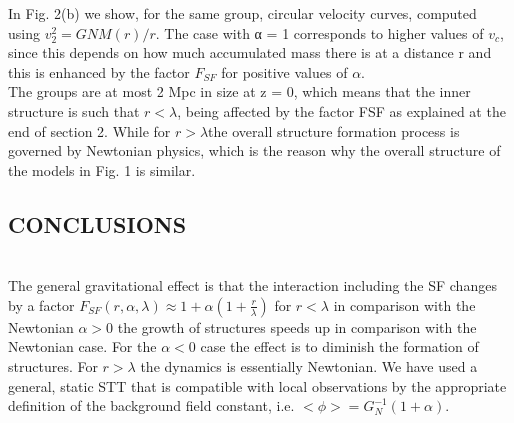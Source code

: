 \documentclass[10pt,twocolumn]{article}
\begin{document}
In Fig. 2(b) we show, for the same group, circular velocity curves, computed using $v^2_{2} = GNM(r)/r$. The case with α = 1 corresponds to higher values of $v_{c}$, since this depends on how much accumulated mass there is at a distance r and this is enhanced by the factor $F_{SF}$ for positive values of $\alpha$.
\\
The groups are at most 2 Mpc in size at z = 0, which means that the inner structure is such that $r < \lambda$, being aﬀected by the factor FSF as explained at the end of section 2. While for $r > \lambda$the overall structure formation process is governed by Newtonian physics, which is the reason why the overall structure of the models in Fig. 1 is similar.
\\
\begin{center}
\section{CONCLUSIONS}
\end{center}
\\
The general gravitational eﬀect is that the interaction including the SF changes by a factor $F_{SF} (r, \alpha, \lambda) ≈ 1 +
\alpha(1+\frac{r}{\lambda})$ for $r < \lambda$ in comparison with the Newtonian $\alpha > 0$ the growth of structures speeds up in comparison with the Newtonian case. For the $\alpha < 0$ case the eﬀect is to diminish the formation of structures.
For $r > \lambda$ the dynamics is essentially Newtonian.
We have used a general, static STT that is compatible with local observations by the appropriate deﬁnition of the background ﬁeld constant, i.e. $< \phi>= G^{-1}_{N} (1 + \alpha)$.
\\
\end{document}
